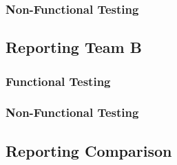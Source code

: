 \documentclass[12pt, oneside]{article}
\begin{document}
		\subsubsection{Non-Functional Testing }
			
	
	\subsection{Reporting Team B}	
		\subsubsection{Functional Testing}
			
		\subsubsection{Non-Functional Testing }
			
	
	\subsection{Reporting Comparison}
\end{document}
